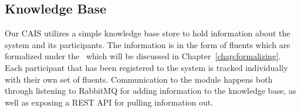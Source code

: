\subsection{Knowledge Base}

Our CAIS utilizes a simple knowledge base store to hold information about the system and its participants.
The information is in the form of fluents which are formalized under the \CEC\, which will be discussed
in Chapter~\ref{chap:formalizing}. Each participant that has been registered to the system is tracked
individually with their own set of fluents. Communication to the module happens both through listening to RabbitMQ for adding information to the knowledge base, as well as exposing a REST API for pulling information
out.